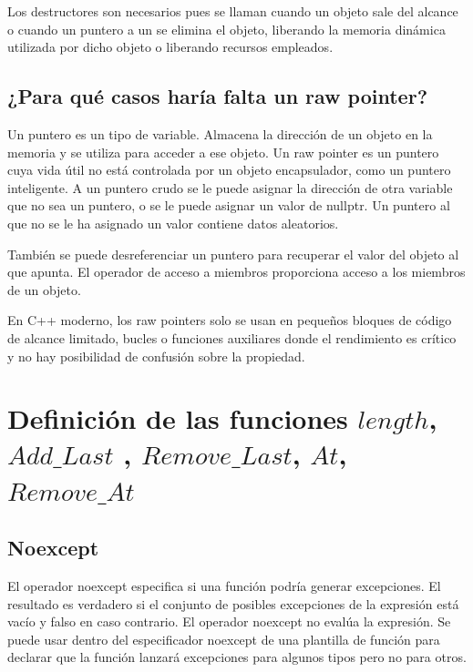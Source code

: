 \documentclass[10pt]{article}
\begin{document}
Los destructores son necesarios pues se llaman cuando un objeto sale del alcance o cuando un puntero a un se elimina el objeto, liberando la memoria dinámica utilizada por dicho objeto o liberando recursos empleados. 

\subsection{¿Para qué casos haría falta un raw pointer?}

Un puntero es un tipo de variable. Almacena la dirección de un objeto en la memoria y se utiliza para acceder a ese objeto. Un raw pointer es un puntero cuya vida útil no está controlada por un objeto encapsulador, como un puntero inteligente. A un puntero crudo se le puede asignar la dirección de otra variable que no sea un puntero, o se le puede asignar un valor de nullptr. Un puntero al que no se le ha asignado un valor contiene datos aleatorios.

También se puede desreferenciar un puntero para recuperar el valor del objeto al que apunta. El operador de acceso a miembros proporciona acceso a los miembros de un objeto.

En C++ moderno, los raw pointers solo se usan en pequeños bloques de código de alcance limitado, bucles o funciones auxiliares donde el rendimiento es crítico y no hay posibilidad de confusión sobre la propiedad.

\vspace{2em}
\section{Definici\'on de las funciones $ length $, $ Add\_Last $ , $ Remove\_Last $, $ At $, $ Remove\_At $}



\subsection{Noexcept}

El operador noexcept especifica si una función podría generar excepciones. El resultado es verdadero si el conjunto de posibles excepciones de la expresión está vacío y falso en caso contrario. El operador noexcept no evalúa la expresión. Se puede usar dentro del especificador noexcept de una plantilla de función para declarar que la función lanzará excepciones para algunos tipos pero no para otros.
\end{document}
